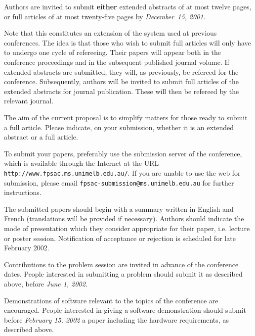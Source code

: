 
\noindent
Authors are invited to submit {\bf either} extended abstracts of at most twelve
pages, or full articles of at most twenty-five pages by {\em December~15, 2001}.

Note that this constitutes an extension of the system used at previous 
conferences. The idea is that those who wish to submit full articles will
only have to undergo one cycle of refereeing. Their papers will appear both
in the conference proceedings and in the subsequent published journal volume. If
extended abstracts are submitted, they will, as previously, be refereed
for the conference. Subsequently, authors will be invited to submit full
articles of the extended abstracts for journal publication.
These will then be refereed by the relevant journal.

The aim of the current proposal is to simplify matters for those ready
to submit a full article. Please indicate, on your submission, whether
it is an extended abstract or a full article.


\smallskip
\noindent
To submit your papers, preferably use the submission server of the
conference, which  is  available through the Internet at the URL 
{\verb!http://www.fpsac.ms.unimelb.edu.au/!}.
If you are unable to use
the web for submission, please email {\verb!fpsac-submission@ms.unimelb.edu.au!} for
further instructions.

\smallskip
\noindent
The submitted papers should begin with a summary written in English
and French (translations will be provided if necessary).  Authors should
indicate the mode of presentation which they consider appropriate for
their paper, i.e. lecture or poster session. Notification of
acceptance or rejection is scheduled for late February 2002.

{}

\noindent
Contributions to the problem session are invited in advance of
the conference dates. People interested in submitting a problem
should submit it as described above, before {\it June 1, 2002}.

\pagebreak
{}

\noindent
Demonstrations of software relevant to the topics of the conference
are encouraged. People interested in giving a software demonstration
should submit before {\it February 15, 2002} a paper including the
hardware  requirements, as described above.


